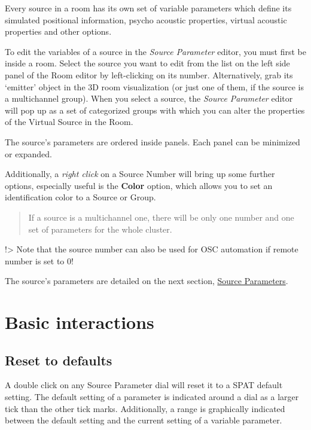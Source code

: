 \documentclass[
  letterpaper,
  DIV=11,
  numbers=noendperiod]{scrreport}
\begin{document}
Every source in a room has its own set of variable parameters which
define its simulated positional information, psycho acoustic properties,
virtual acoustic properties and other options.

To edit the variables of a source in the \emph{Source Parameter} editor,
you must first be inside a room. Select the source you want to edit from
the list on the left side panel of the Room editor by left-clicking on
its number. Alternatively, grab its `emitter' object in the 3D room
visualization (or just one of them, if the source is a multichannel
group). When you select a source, the \emph{Source Parameter} editor
will pop up as a set of categorized groups with which you can alter the
properties of the Virtual Source in the Room.

The source's parameters are ordered inside panels. Each panel can be
minimized or expanded.

Additionally, a \emph{right click} on a Source Number will bring up some
further options, especially useful is the \textbf{Color} option, which
allows you to set an identification color to a Source or Group.

\begin{quote}
If a source is a multichannel one, there will be only one number and one
set of parameters for the whole cluster.
\end{quote}

!\textgreater{} Note that the source number can also be used for OSC
automation if remote number is set to 0!

The source's parameters are detailed on the next section,
\href{Spat_Environment_Source_Parameters.md}{Source Parameters}.

\hypertarget{basic-interactions}{%
\section{Basic interactions}\label{basic-interactions}}

\hypertarget{reset-to-defaults}{%
\subsection{Reset to defaults}\label{reset-to-defaults}}

A double click on any Source Parameter dial will reset it to a SPAT
default setting. The default setting of a parameter is indicated around
a dial as a larger tick than the other tick marks. Additionally, a range
is graphically indicated between the default setting and the current
setting of a variable parameter.
\end{document}
